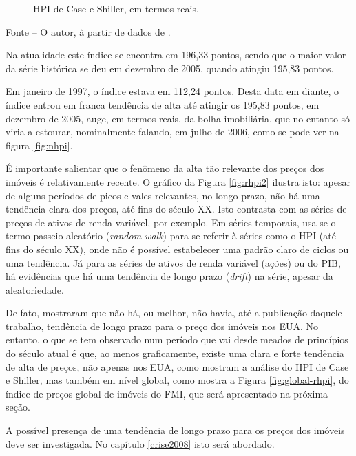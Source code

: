 \documentclass[
	12pt,				%
	oneside,			%
	a4paper,			%
	chapter=TITLE,		%
	section=TITLE,		%
	english,			%
	brazil				%
	]{abntex2}
\newcommand{\bcenter}{\begin{center}}
\newcommand{\ecenter}{\end{center}}
\begin{document}
\begin{refsection}
\begin{figure}[H]
{}

\caption{\gls{HPI} de Case e Shiller, em termos reais.}\label{fig:rhpi1}
\end{figure}
\bcenter

\small Fonte -- O autor, à partir de dados de \textcite{QuandlWIKI}.
\ecenter

Na atualidade este índice se encontra em 196,33 pontos, sendo
que o maior valor da série histórica se deu em dezembro de 2005, quando atingiu
195,83 pontos.

Em janeiro de 1997, o índice estava em 112,24 pontos.
Desta data em diante, o índice entrou em franca tendência de alta até atingir os
195,83 pontos, em dezembro de 2005, auge, em termos
reais, da bolha imobiliária, que no entanto só viria a estourar, nominalmente
falando, em julho de 2006, como se pode ver na figura \ref{fig:nhpi}.

É importante salientar que o fenômeno da alta tão relevante dos preços dos
imóveis é relativamente recente. O gráfico da Figura \ref{fig:rhpi2} ilustra
isto: apesar de alguns períodos de picos e vales relevantes, no longo prazo, não
há uma tendência clara dos preços, até fins do século XX. Isto contrasta com as
séries de preços de ativos de renda variável, por exemplo. Em séries temporais,
usa-se o termo passeio aleatório (\emph{random walk}) para se referir à séries como o
HPI (até fins do século XX), onde não é possível estabelecer uma padrão claro de
ciclos ou uma tendência. Já para as séries de ativos de renda variável (ações)
ou do \gls{PIB}, há evidências que há uma tendência de longo prazo (\emph{drift}) na
série, apesar da aleatoriedade.

De fato, \textcite[p.~290-291]{supplyelasticity} mostraram que não há, ou melhor, não
havia, até a publicação daquele trabalho, tendência de longo prazo para o preço
dos imóveis nos \gls{EUA}. No entanto, o que se tem observado num período que
vai desde meados de princípios do século atual é que, ao menos graficamente,
existe uma clara e forte tendência de alta de preços, não apenas nos \gls{EUA},
como mostram a análise do HPI de Case e Shiller, mas também em nível global,
como mostra a Figura \ref{fig:global-rhpi}, do índice de preços global de
imóveis do \gls{FMI}, que será apresentado na próxima seção.

A possível presença de uma tendência de longo prazo para os preços dos imóveis
deve ser investigada. No capítulo \ref{crise2008} isto será abordado.
\begin{figure}[H]


\end{figure}
\end{refsection}
\end{document}
